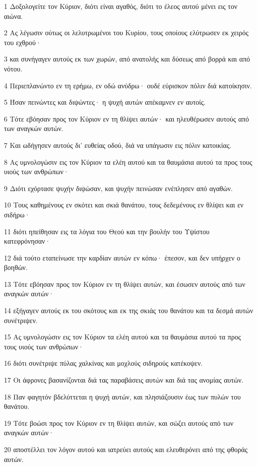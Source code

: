 \par 1 Δοξολογείτε τον Κύριον, διότι είναι αγαθός, διότι το έλεος αυτού μένει εις τον αιώνα.
\par 2 Ας λέγωσιν ούτως οι λελυτρωμένοι του Κυρίου, τους οποίους ελύτρωσεν εκ χειρός του εχθρού·
\par 3 και συνήγαγεν αυτούς εκ των χωρών, από ανατολής και δύσεως από βορρά και από νότου.
\par 4 Περιεπλανώντο εν τη ερήμω, εν οδώ ανύδρω· ουδέ εύρισκον πόλιν διά κατοίκησιν.
\par 5 Ήσαν πεινώντες και διψώντες· η ψυχή αυτών απέκαμνεν εν αυτοίς.
\par 6 Τότε εβόησαν προς τον Κύριον εν τη θλίψει αυτών· και ηλευθέρωσεν αυτούς από των αναγκών αυτών.
\par 7 Και ωδήγησεν αυτούς δι' ευθείας οδού, διά να υπάγωσιν εις πόλιν κατοικίας.
\par 8 Ας υμνολογώσιν εις τον Κύριον τα ελέη αυτού και τα θαυμάσια αυτού τα προς τους υιούς των ανθρώπων·
\par 9 Διότι εχόρτασε ψυχήν διψώσαν, και ψυχήν πεινώσαν ενέπλησεν από αγαθών.
\par 10 Τους καθημένους εν σκότει και σκιά θανάτου, τους δεδεμένους εν θλίψει και εν σιδήρω·
\par 11 διότι ηπείθησαν εις τα λόγια του Θεού και την βουλήν του Υψίστου κατεφρόνησαν·
\par 12 διά τούτο εταπείνωσε την καρδίαν αυτών εν κόπω· έπεσον, και δεν υπήρχεν ο βοηθών.
\par 13 Τότε εβόησαν προς τον Κύριον εν τη θλίψει αυτών, και έσωσεν αυτούς από των αναγκών αυτών·
\par 14 εξήγαγεν αυτούς εκ του σκότους και εκ της σκιάς του θανάτου και τα δεσμά αυτών συνέτριψεν.
\par 15 Ας υμνολογώσιν εις τον Κύριον τα ελέη αυτού και τα θαυμάσια αυτού τα προς τους υιούς των ανθρώπων·
\par 16 διότι συνέτριψε πύλας χαλκίνας και μοχλούς σιδηρούς κατέκοψεν.
\par 17 Οι άφρονες βασανίζονται διά τας παραβάσεις αυτών και διά τας ανομίας αυτών.
\par 18 Παν φαγητόν βδελύττεται η ψυχή αυτών, και πλησιάζουσιν έως των πυλών του θανάτου.
\par 19 Τότε βοώσι προς τον Κύριον εν τη θλίψει αυτών, και σώζει αυτούς από των αναγκών αυτών·
\par 20 αποστέλλει τον λόγον αυτού και ιατρεύει αυτούς και ελευθερόνει από της φθοράς αυτών.

